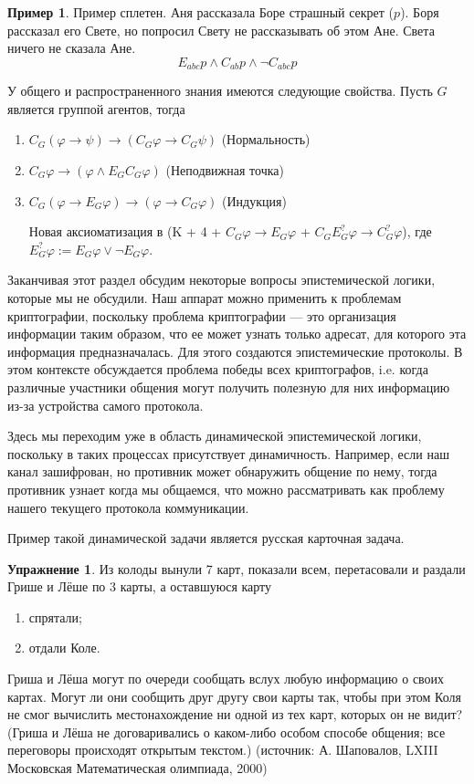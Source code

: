 \documentclass[openany]{book}
\theoremstyle{plain}
\theoremstyle{definition}
\newtheorem{xrc}{Упражнение}[]
\newtheorem{eg}{Пример}[]
\begin{document}
\begin{eg}
    Пример сплетен. Аня рассказала Боре страшный секрет (\(p\)). Боря рассказал его Свете, но попросил Свету не рассказывать об этом Ане. Света ничего не сказала Ане.
    \[E_{abc} p \land C_{ab} p \land \neg C_{abc} p\]
\end{eg}

У общего и распространенного знания имеются следующие свойства. Пусть \(G\) является группой агентов, тогда
\begin{enumerate}
    \item \(C_G (\varphi \to \psi) \to (C_G \varphi \to C_G \psi)\) (Нормальность)
    \item \(C_G \varphi \to (\varphi \land E_G C_G \varphi)\) (Неподвижная точка)
    \item \(C_G (\varphi \to E_G \varphi) \to (\varphi \to C_G \varphi)\) (Индукция)

	Новая аксиоматизация в \cite{Herzig} (K + 4 + \(C_G \varphi \to E_G \varphi\) + \(C_G E_G^? \varphi \to C_G^? \varphi\)), где \(E_G^? \varphi := E_G \varphi \lor \neg E_G \varphi\).
\end{enumerate}

Заканчивая этот раздел обсудим некоторые вопросы эпистемической логики, которые мы не обсудили. 
Наш аппарат можно применить к проблемам криптографии, поскольку проблема криптографии --- это организация информации таким образом, что ее может узнать только адресат, для которого эта информация предназначалась. Для этого создаются эпистемические протоколы. В этом контексте обсуждается проблема победы всех криптографов, i.e. когда различные участники общения могут получить полезную для них информацию из-за устройства самого протокола.

Здесь мы переходим уже в область динамической эпистемической логики, поскольку в таких процессах присутствует динамичность. Например, если наш канал зашифрован, но противник может обнаружить общение по нему, тогда противник узнает когда мы общаемся, что можно рассматривать как проблему нашего текущего протокола коммуникации.

Пример такой динамической задачи является русская карточная задача.
\begin{xrc}
    Из колоды вынули 7 карт, показали всем, перетасовали и раздали Грише и Лёше по 3 карты, а оставшуюся карту
    \begin{enumerate}
	\item спрятали;
	\item отдали Коле.
    \end{enumerate}
    Гриша и Лёша могут по очереди сообщать вслух любую информацию о своих картах. Могут ли они сообщить друг другу свои карты так, чтобы при этом Коля не смог вычислить местонахождение ни одной из тех карт, которых он не видит? (Гриша и Лёша не договаривались о каком-либо особом способе общения; все переговоры происходят открытым текстом.) (источник: А. Шаповалов, LXIII Московская Математическая олимпиада, 2000)
\end{xrc}
\end{document}
